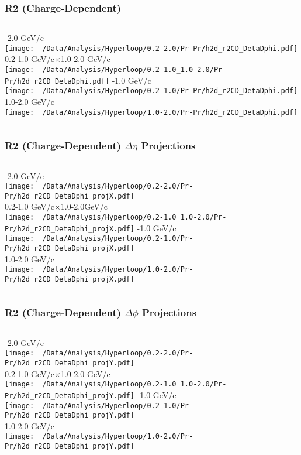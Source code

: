 \documentclass{beamer}
\begin{document}
\begin{frame}
	\frametitle{R2 (Charge-Dependent)}
	\begin{columns}
		-2.0 GeV/c\\
		\texttt{[image: ~/Data/Analysis/Hyperloop/0.2-2.0/Pr-Pr/h2d\_r2CD\_DetaDphi.pdf]}\\0.2-1.0 GeV/c$\times$1.0-2.0 GeV/c\\
		\texttt{[image: ~/Data/Analysis/Hyperloop/0.2-1.0\_1.0-2.0/Pr-Pr/h2d\_r2CD\_DetaDphi.pdf]}
		-1.0 GeV/c\\
		\texttt{[image: ~/Data/Analysis/Hyperloop/0.2-1.0/Pr-Pr/h2d\_r2CD\_DetaDphi.pdf]}\\1.0-2.0 GeV/c\\
		\texttt{[image: ~/Data/Analysis/Hyperloop/1.0-2.0/Pr-Pr/h2d\_r2CD\_DetaDphi.pdf]}
	\end{columns}
\end{frame}
\begin{frame}
	\frametitle{R2 (Charge-Dependent) $\Delta\eta$ Projections}
	\begin{columns}
		\column{0.5\textwidth}
		-2.0 GeV/c\\
		\texttt{[image: ~/Data/Analysis/Hyperloop/0.2-2.0/Pr-Pr/h2d\_r2CD\_DetaDphi\_projX.pdf]}\\0.2-1.0 GeV/c$\times$1.0-2.0GeV/c\\
		\texttt{[image: ~/Data/Analysis/Hyperloop/0.2-1.0\_1.0-2.0/Pr-Pr/h2d\_r2CD\_DetaDphi\_projX.pdf]}
		\column{0.5\textwidth}
		-1.0 GeV/c\\
		\texttt{[image: ~/Data/Analysis/Hyperloop/0.2-1.0/Pr-Pr/h2d\_r2CD\_DetaDphi\_projX.pdf]}\\1.0-2.0 GeV/c\\
		\texttt{[image: ~/Data/Analysis/Hyperloop/1.0-2.0/Pr-Pr/h2d\_r2CD\_DetaDphi\_projX.pdf]}
	\end{columns}
\end{frame}
\begin{frame}
	\frametitle{R2 (Charge-Dependent) $\Delta\phi$ Projections}
	\begin{columns}
		-2.0 GeV/c\\
		\texttt{[image: ~/Data/Analysis/Hyperloop/0.2-2.0/Pr-Pr/h2d\_r2CD\_DetaDphi\_projY.pdf]}\\0.2-1.0 GeV/c$\times$1.0-2.0 GeV/c\\
		\texttt{[image: ~/Data/Analysis/Hyperloop/0.2-1.0\_1.0-2.0/Pr-Pr/h2d\_r2CD\_DetaDphi\_projY.pdf]}
		-1.0 GeV/c\\
		\texttt{[image: ~/Data/Analysis/Hyperloop/0.2-1.0/Pr-Pr/h2d\_r2CD\_DetaDphi\_projY.pdf]}\\1.0-2.0 GeV/c\\
		\texttt{[image: ~/Data/Analysis/Hyperloop/1.0-2.0/Pr-Pr/h2d\_r2CD\_DetaDphi\_projY.pdf]}
	\end{columns}
\end{frame}
\end{document}
